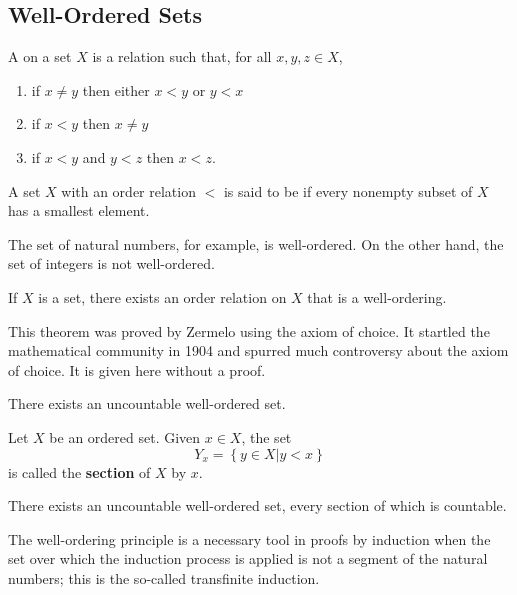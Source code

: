 \subsection{Well-Ordered Sets}

A  on a set $X$ is a relation such that, for all $x, y, z \in X$,
\begin{enumerate}
\item if $x \neq y$ then either $x < y$ or $y < x$
\item if $x < y$ then $x \neq y$
\item if $x < y$ and $y < z$ then $x < z$.
\end{enumerate}

\begin{definition}
A set $X$ with an order relation $<$ is said to be  if every nonempty subset of $X$ has a smallest element.
\end{definition}

The set of natural numbers, for example, is well-ordered.
On the other hand, the set of integers is not well-ordered.

\begin{fact}
If $X$ is a set, there exists an order relation on $X$ that is a well-ordering.
\end{fact}

This theorem was proved by Zermelo using the axiom of choice.
It startled the mathematical community in 1904 and spurred much controversy about the axiom of choice.
It is given here without a proof.

\begin{corollary}
There exists an uncountable well-ordered set.
\end{corollary}

\begin{definition}
Let $X$ be an ordered set.
Given $x \in X$, the set
\begin{equation*}
Y_x = \left\{ y \in X | y < x \right\}
\end{equation*}
is called the \textbf{section} of $X$ by $x$.
\end{definition}

\begin{corollary}
There exists an uncountable well-ordered set, every section of which is countable.
\end{corollary}

The well-ordering principle is a necessary tool in proofs by induction when the set over which the induction process is applied is not a segment of the natural numbers; this is the so-called transfinite induction.


